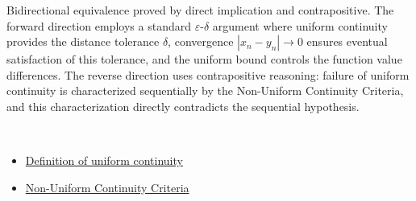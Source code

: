 \begin{remark*}
Bidirectional equivalence proved by direct implication and contrapositive. The forward direction employs a standard $\varepsilon$-$\delta$ argument where uniform continuity provides the distance tolerance $\delta$, convergence $|x_n - y_n| \to 0$ ensures eventual satisfaction of this tolerance, and the uniform bound controls the function value differences. The reverse direction uses contrapositive reasoning: failure of uniform continuity is characterized sequentially by the Non-Uniform Continuity Criteria, and this characterization directly contradicts the sequential hypothesis.
\end{remark*}

\begin{remark*}[Dependencies]~\\
\begin{itemize}
  \item \hyperref[def:uniform-continuity]{Definition of uniform continuity}
  \item \hyperref[prop:non-uniform-continuity-criteria]{Non-Uniform Continuity Criteria}
\end{itemize}
\end{remark*}
